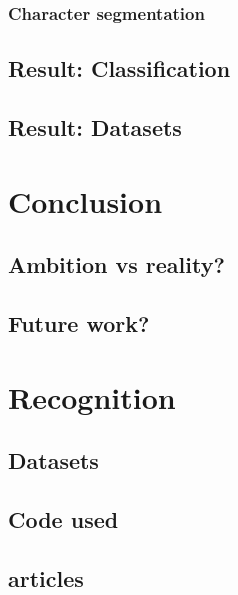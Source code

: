 \documentclass[11pt,a4paper,UKenglish]{report}
\begin{document}
\subsection{Character segmentation}

\section{Result: Classification}
\section{Result: Datasets}


\newpage
\chapter{Conclusion}
\label{sec:Conclusion}
\section{Ambition vs reality?}
\section{Future work?}

\newpage
\chapter{Recognition}
\label{sec:Recognition}
\section{Datasets}
\section{Code used}
\section{articles}


\end{document}
